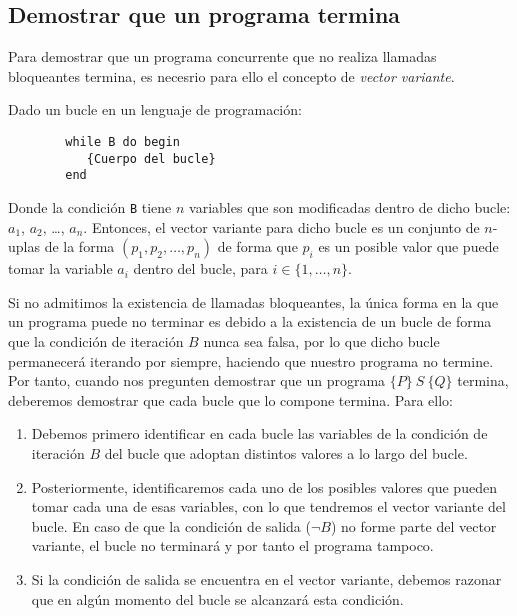 \subsection{Demostrar que un programa termina}
Para demostrar que un programa concurrente que no realiza llamadas bloqueantes termina, es necesrio para ello el concepto de \textit{vector variante}.

\begin{definicion}
    Dado un bucle en un lenguaje de programación:
    \begin{verbatim}
        while B do begin
           {Cuerpo del bucle}
        end
    \end{verbatim}
    Donde la condición \verb|B| tiene $n$ variables que son modificadas dentro de dicho bucle: $a_1$, $a_2$, \ldots, $a_n$. Entonces, el vector variante para dicho bucle es un conjunto de $n$-uplas de la forma $(p_1, p_2, \ldots, p_n)$ de forma que $p_i$ es un posible valor que puede tomar la variable $a_i$ dentro del bucle, para $i \in \{1, \ldots, n\}$.
\end{definicion}

Si no admitimos la existencia de llamadas bloqueantes, la única forma en la que un programa puede no terminar es debido a la existencia de un bucle de forma que la condición de iteración $B$ nunca sea falsa, por lo que dicho bucle permanecerá iterando por siempre, haciendo que nuestro programa no termine.\\

Por tanto, cuando nos pregunten demostrar que un programa $\{P\}\ S\ \{Q\}$ termina, deberemos demostrar que cada bucle que lo compone termina. Para ello:
\begin{enumerate}
    \item Debemos primero identificar en cada bucle las variables de la condición de iteración $B$ del bucle que adoptan distintos valores a lo largo del bucle.
    \item Posteriormente, identificaremos cada uno de los posibles valores que pueden tomar cada una de esas variables, con lo que tendremos el vector variante del bucle.
        En caso de que la condición de salida ($\lnot B$) no forme parte del vector variante, el bucle no terminará y por tanto el programa tampoco.
    \item Si la condición de salida se encuentra en el vector variante, debemos razonar que en algún momento del bucle se alcanzará esta condición.
\end{enumerate}


